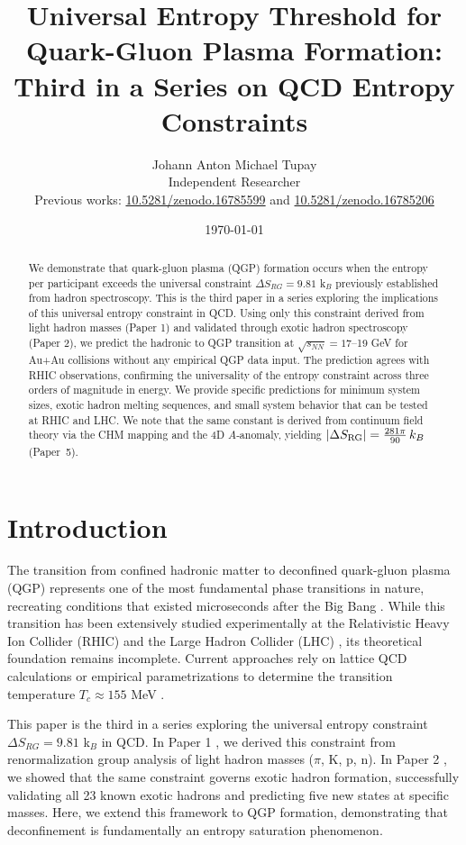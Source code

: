 \documentclass[12pt,a4paper]{article}
\title{Universal Entropy Threshold for Quark-Gluon Plasma Formation:\\
Third in a Series on QCD Entropy Constraints}
\author{Johann Anton Michael Tupay\\
\small{Independent Researcher}\\
\small{Previous works: \href{https://zenodo.org/records/16785599}{10.5281/zenodo.16785599} 
and \href{https://zenodo.org/records/16785206}{10.5281/zenodo.16785206}}}
\date{\today}
\begin{document}
\maketitle

\begin{abstract}
We demonstrate that quark-gluon plasma (QGP) formation occurs when the entropy per participant exceeds the universal constraint $\Delta S_{RG} = 9.81$ k$_B$ previously established from hadron spectroscopy. This is the third paper in a series exploring the implications of this universal entropy constraint in QCD. Using only this constraint derived from light hadron masses (Paper 1) and validated through exotic hadron spectroscopy (Paper 2), we predict the hadronic to QGP transition at $\sqrt{s_{NN}} = 17$--19 GeV for Au+Au collisions without any empirical QGP data input. The prediction agrees with RHIC observations, confirming the universality of the entropy constraint across three orders of magnitude in energy. We provide specific predictions for minimum system sizes, exotic hadron melting sequences, and small system behavior that can be tested at RHIC and LHC. We note that the same constant is derived from continuum field theory via the CHM mapping and the 4D $A$‑anomaly, yielding $|\Delta S_{\rm RG}|=\frac{281\pi}{90}\,k_B$ (Paper~5).
\end{abstract}

\section{Introduction}

The transition from confined hadronic matter to deconfined quark-gluon plasma (QGP) represents one of the most fundamental phase transitions in nature, recreating conditions that existed microseconds after the Big Bang \cite{Shuryak2004,Muller2012}. While this transition has been extensively studied experimentally at the Relativistic Heavy Ion Collider (RHIC) \cite{STAR2005,PHENIX2005,BRAHMS2005,PHOBOS2005} and the Large Hadron Collider (LHC) \cite{ALICE2011,CMS2012,ATLAS2013}, its theoretical foundation remains incomplete. Current approaches rely on lattice QCD calculations \cite{Borsanyi2014,HotQCD2014,Bazavov2017} or empirical parametrizations to determine the transition temperature $T_c \approx 155$ MeV \cite{Andronic2018}.

This paper is the third in a series exploring the universal entropy constraint $\Delta S_{RG} = 9.81$ k$_B$ in QCD. In Paper 1 \cite{Paper1}, we derived this constraint from renormalization group analysis of light hadron masses ($\pi$, K, p, n). In Paper 2 \cite{Paper2}, we showed that the same constraint governs exotic hadron formation, successfully validating all 23 known exotic hadrons and predicting five new states at specific masses. Here, we extend this framework to QGP formation, demonstrating that deconfinement is fundamentally an entropy saturation phenomenon.
\end{document}
